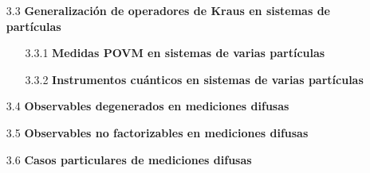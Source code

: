 \documentclass[12pt,oneside]{book}\raggedbottom{} %
\begin{document}
\begin{sloppypar}
{{\begin{itemize}
\begin{itemize}
    \item[3.2.2] \textbf{Instrumentos cuánticos para dos partículas:}
\item[3.2.3]\textbf{{Equivalencia de los instrumentos}:}
\item[3.2.4] \textbf{Ejemplos sobre los efectos de una medición difusa:}
  \end{itemize}

 
  \item[3.3 ] \textbf{Generalización de operadores de Kraus en sistemas de \texorpdfstring{}{N} partículas}

\begin{itemize}
  \item[3.3.1] \textbf{Medidas POVM en sistemas de varias partículas}
  \item[3.3.2] \textbf{Instrumentos cuánticos en sistemas de varias partículas} 
\end{itemize}

\item[3.4]\textbf{Observables degenerados en mediciones difusas} 

\item[3.5] \textbf{Observables no factorizables en mediciones difusas} %

\item[3.6] \textbf{Casos particulares de mediciones difusas} 




\end{itemize}}}
\end{sloppypar}
\end{document}
